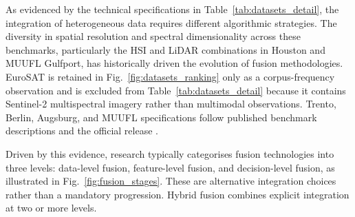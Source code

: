 \documentclass[]{interact}
\theoremstyle{plain}%
\theoremstyle{definition}
\theoremstyle{remark}
\DeclareRobustCommand{\DIFadd}[1]{{\protect\color{DIFaddcolor}\uwave{#1}}}
\DeclareRobustCommand{\DIFdel}[1]{{\protect\color{DIFdelcolor}\sout{#1}}}
\def\DIFadd#1{#1}%
\def\DIFdel#1{}%
\begin{document}
As evidenced by the technical specifications in Table~\ref{tab:datasets_detail}, the integration of heterogeneous data requires different algorithmic strategies. The diversity in spatial resolution and spectral dimensionality across these benchmarks, particularly the HSI and LiDAR combinations in Houston and \DIFdel{Muufl} \DIFadd{MUUFL} \DIFadd{Gulfport}, has historically driven the evolution of fusion methodologies.  \DIFadd{EuroSAT} \DIFadd{is} \DIFadd{retained} \DIFadd{in} \DIFadd{Fig}\DIFadd{.}\DIFadd{~}{\color{blue}\ref{fig:datasets_ranking} }\DIFadd{only} \DIFadd{as} \DIFadd{a} \DIFadd{corpus-frequency} \DIFadd{observation} \DIFadd{and} \DIFadd{is} \DIFadd{excluded} \DIFadd{from} \DIFadd{Table}\DIFadd{~}{\color{blue}\ref{tab:datasets_detail} }\DIFadd{because} \DIFadd{it} \DIFadd{contains} \DIFadd{Sentinel-2} \DIFadd{multispectral} \DIFadd{imagery} \DIFadd{rather} \DIFadd{than} \DIFadd{multimodal} \DIFadd{observations}\DIFadd{.} \DIFadd{Trento}\DIFadd{,} \DIFadd{Berlin}\DIFadd{,} \DIFadd{Augsburg}\DIFadd{,} \DIFadd{and} \DIFadd{MUUFL} \DIFadd{specifications} \DIFadd{follow} \DIFadd{published} \DIFadd{benchmark} \DIFadd{descriptions} \DIFadd{and} \DIFadd{the} \DIFadd{official} \DIFadd{release} {\color{blue}\citep{duan2020multilevel,hong2021benchmarks,gader2013muufl,zare2018muufl}}\DIFadd{.}

Driven by this evidence, research typically \DIFdel{categorizes} \DIFadd{categorises} fusion technologies into three \DIFdel{progressive} \DIFdel{stages} \DIFadd{levels}: \DIFdel{Data-level} \DIFdel{Fusion} \DIFadd{data-level} \DIFadd{fusion}, \DIFdel{Feature-level} \DIFdel{Fusion} \DIFadd{feature-level} \DIFadd{fusion}, and \DIFdel{Decision-level} \DIFdel{Fusion} \DIFadd{decision-level} \DIFadd{fusion}, as illustrated in Fig.~\ref{fig:fusion_stages}. \DIFdel{The} \DIFdel{robust} \DIFdel{data} \DIFdel{structures} \DIFdel{provided} \DIFdel{by} \DIFdel{these} \DIFdel{benchmarks} \DIFdel{have} \DIFdel{specifically} \DIFdel{catalyzed} \DIFdel{the} \DIFdel{shift} \DIFdel{toward} \DIFdel{feature-level} \DIFadd{These} \DIFadd{are} \DIFadd{alternative} \DIFadd{integration} \DIFadd{choices} \DIFadd{rather} \DIFadd{than} \DIFadd{a} \DIFadd{mandatory} \DIFadd{progression}\DIFadd{.} \DIFadd{Hybrid} fusion\DIFdel{,} \DIFdel{which} \DIFdel{uses} \DIFdel{deep} \DIFdel{learning} \DIFdel{to} \DIFdel{align} \DIFdel{complex} \DIFdel{semantic} \DIFdel{representations} \DIFdel{from} \DIFdel{different} \DIFdel{sensors} \DIFadd{combines} \DIFadd{explicit} \DIFadd{integration} \DIFadd{at} \DIFadd{two} \DIFadd{or} \DIFadd{more} \DIFadd{levels}.
\end{document}
